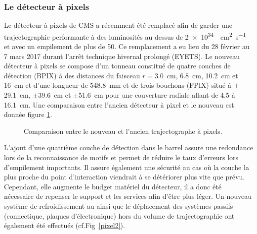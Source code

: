 \subsubsection{Le détecteur à pixels}
Le détecteur à pixels de CMS a récemment été remplacé afin de garder une trajectographie performante à des luminosités au dessus de \SI{2e34}{\per\square\centi\meter\per\second} et avec un empilement de plus de \num{50}. Ce remplacement a eu lieu du \num{28} février au \num{7} mars \num{2017} durant l'arrêt technique hivernal prolongé (EYETS). Le nouveau détecteur à pixels se compose d'un tonneau constitué de quatre couches de détection (BPIX) à des distances du faisceau $r=$\SI{3.0}{\centi\meter}, \SI{6.8}{\centi\meter}, \SI{10.2}{\centi\meter} et \SI{16}{\centi\meter} et d'une longueur de \SI{548.8}{\milli\meter} et de trois bouchons (FPIX) situé à $\pm$\SI{29.1}{\centi\meter}, $\pm$\SI{39.6}{\centi\meter} et $\pm$\SI{51.6}{\centi\meter} pour une couverture radiale allant de \num{4.5} à \SI{16.1}{\centi\meter}. Une comparaison entre l'ancien détecteur à pixel et le nouveau est donnée figure \ref{pixel}.

	\begin{figure}[ht!]
	\hfill
	\caption{Comparaison entre le nouveau et l'ancien trajectographe à pixels.}
	\label{pixel}
\end{figure}

L'ajout d'une quatrième couche de détection dans le barrel assure une redondance lors de la reconnaissance de motifs et permet de réduire le taux d'erreurs lors d'empilement importants. Il assure également une sécurité au cas où la couche la plus proche du point d'interaction viendrait à se détériorer plus vite que prévu. Cependant, elle augmente le budget matériel du détecteur, il a donc été nécessaire de repenser le support et les services afin d'être plus léger. Un nouveau système de refroidissement au  ainsi que le déplacement des systèmes passifs (connectique, plaques d'électronique) hors du volume de trajectographie ont également été effectués (cf.Fig~\ref{pixel2}).

